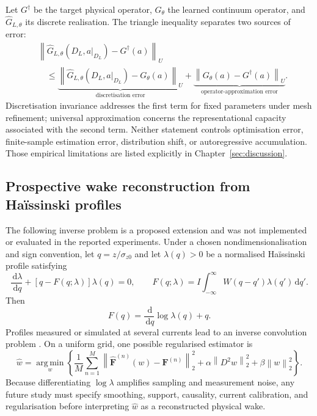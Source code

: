 \documentclass[11pt,a4paper]{article}
\providecommand{\norm}[1]{\left\lVert#1\right\rVert}
\providecommand{\argmin}{\operatorname*{arg\,min}}
\providecommand{\dd}{\,\mathrm{d}}
\begin{document}
\begin{sloppypar}
Let \(G^{\dagger}\) be the target physical operator, \(G_{\theta}\) the learned continuum operator, and \(\widehat{G}_{L,\theta}\) its discrete realisation. The triangle inequality separates two sources of error:
\begin{align}
    &\norm{
        \widehat{G}_{L,\theta}(D_L,a|_{D_L})
        -G^{\dagger}(a)
    }_{U}
    \nonumber\\
    &\quad\leq
    \underbrace{
        \norm{
            \widehat{G}_{L,\theta}(D_L,a|_{D_L})
            -G_{\theta}(a)
        }_{U}
    }_{\text{discretisation error}}
    +
    \underbrace{
        \norm{
            G_{\theta}(a)-G^{\dagger}(a)
        }_{U}
    }_{\text{operator-approximation error}}.
    \label{eq:app_error_decomposition}
\end{align}
Discretisation invariance addresses the first term for fixed parameters under mesh refinement; universal approximation concerns the representational capacity associated with the second term. Neither statement controls optimisation error, finite-sample estimation error, distribution shift, or autoregressive accumulation. Those empirical limitations are listed explicitly in Chapter~\ref{sec:discussion}.

\subsection{Prospective wake reconstruction from Ha\"issinski profiles}

The following inverse problem is a proposed extension and was not implemented or evaluated in the reported experiments. Under a chosen nondimensionalisation and sign convention, let \(q=z/\sigma_{z0}\) and let \(\lambda(q)>0\) be a normalised Ha\"issinski profile satisfying
\begin{equation}
    \frac{\dd\lambda}{\dd q}
    +\left[q-F(q;\lambda)\right]\lambda(q)=0,
    \qquad
    F(q;\lambda)
    =I\int_{-\infty}^{\infty}W(q-q')\lambda(q')\dd q'.
    \label{eq:app_haissinski_inverse_start}
\end{equation}
Then
\begin{equation}
    F(q)=\frac{\dd}{\dd q}\log\lambda(q)+q.
\end{equation}
Profiles measured or simulated at several currents lead to an inverse convolution problem \cite{zhou_theories_2023,funkner_haissinski_2025}. On a uniform grid, one possible regularised estimator is
\begin{equation}
    \widehat{w}
    =
    \argmin_{w}
    \left\{
        \frac{1}{M}
        \sum_{n=1}^{M}
        \norm{
            \widehat{\bm F}^{(n)}(w)-\bm F^{(n)}
        }_2^2
        +\alpha\norm{D^2w}_2^2
        +\beta\norm{w}_2^2
    \right\}.
    \label{eq:app_wake_inverse_objective}
\end{equation}
Because differentiating \(\log\lambda\) amplifies sampling and measurement noise, any future study must specify smoothing, support, causality, current calibration, and regularisation before interpreting \(\widehat{w}\) as a reconstructed physical wake.

\end{sloppypar}
\end{document}
